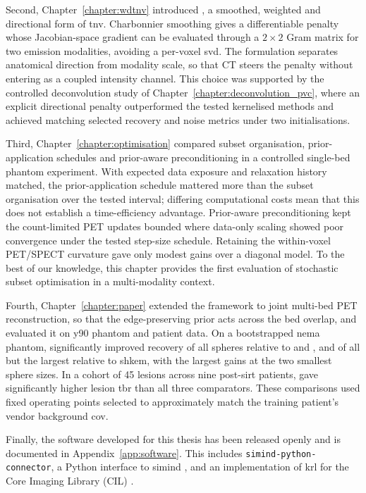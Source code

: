 Second, Chapter~\ref{chapter:wdtnv} introduced \wdtnv, a smoothed, weighted and directional form of \gls{tnv}. Charbonnier smoothing gives a differentiable penalty whose Jacobian-space gradient can be evaluated through a $2\times2$ Gram matrix for two emission modalities, avoiding a per-voxel \gls{svd}. The formulation separates anatomical direction from modality scale, so that CT steers the penalty without entering as a coupled intensity channel. This choice was supported by the controlled deconvolution study of Chapter~\ref{chapter:deconvolution_pvc}, where an explicit directional penalty outperformed the tested kernelised methods and achieved matching selected recovery and noise metrics under two initialisations.

Third, Chapter~\ref{chapter:optimisation} compared subset organisation, prior-application schedules and prior-aware preconditioning in a controlled single-bed phantom experiment. With expected data exposure and relaxation history matched, the prior-application schedule mattered more than the subset organisation over the tested interval; differing computational costs mean that this does not establish a time-efficiency advantage. Prior-aware preconditioning kept the count-limited PET updates bounded where data-only scaling showed poor convergence under the tested step-size schedule. Retaining the within-voxel PET/SPECT curvature gave only modest gains over a diagonal model. To the best of our knowledge, this chapter provides the first evaluation of stochastic subset optimisation in a multi-modality context.

Fourth, Chapter~\ref{chapter:paper} extended the framework to joint multi-bed PET reconstruction, so that the edge-preserving prior acts across the bed overlap, and evaluated it on \gls{y90} phantom and patient data. On a bootstrapped \gls{nema} phantom, \wdtnv{} significantly improved recovery of all spheres relative to \dtv{} and \wtnv, and of all but the largest relative to \gls{shkem}, with the largest gains at the two smallest sphere sizes. In a cohort of 45 lesions across nine post-\gls{sirt} patients, \wdtnv{} gave significantly higher lesion \gls{tbr} than all three comparators. These comparisons used fixed operating points selected to approximately match the training patient's vendor background \gls{cov}.

Finally, the software developed for this thesis has been released openly and is documented in Appendix~\ref{app:software}. This includes \texttt{simind-python-connector}, a Python interface to \gls{simind} \cite{porterSimindPythonConnector2026}, and an implementation of \gls{krl} for the Core Imaging Library (CIL) \cite{porterCilKrl2026}.

